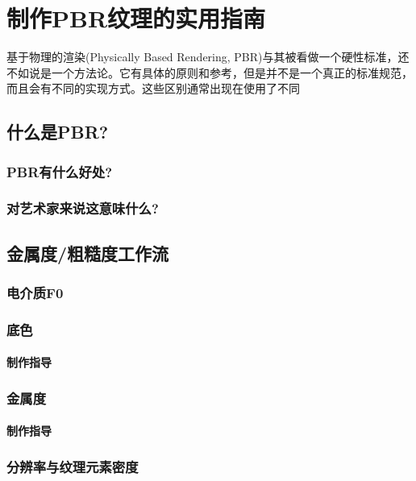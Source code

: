 \chapter{制作PBR纹理的实用指南}

基于物理的渲染(Physically Based Rendering, PBR)与其被看做一个硬性标准，还不如说是一个方法论。它有具体的原则和参考，但是并不是一个真正的标准规范，而且会有不同的实现方式。这些区别通常出现在使用了不同

\section{什么是PBR?}

\subsection{PBR有什么好处?}

\subsection{对艺术家来说这意味什么?}

\section{金属度/粗糙度工作流}

\subsection{电介质F0}

\subsection{底色}

\subsubsection{制作指导}

\subsection{金属度}

\subsubsection{制作指导}

\subsection{分辨率与纹理元素密度}

